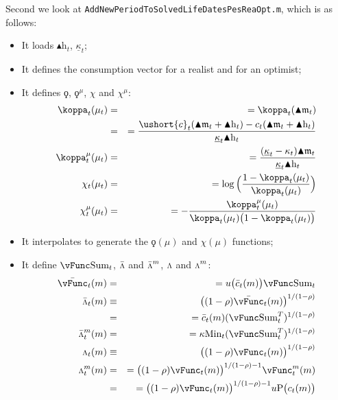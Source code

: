 \documentclass[titlepage,abstract]{\econtex}
\providecommand{\kappaMin}{\kappa\text{Min}}
\providecommand{\vSum}{\vFunc\text{Sum}}
\providecommand{\Deltah}{\blacktriangle \mathrm{h}}
\providecommand{\Deltam}{\blacktriangle \mathfrak{m}}
\providecommand{\vInv}{\ensuremath{\scriptstyle \Lambda \displaystyle}}
\begin{document}
Second we look at \texttt{AddNewPeriodToSolvedLifeDatesPesReaOpt.m}, which is as follows:
        \begin{itemize}
        \item It loads $\Deltah_{t}$, $\underline{\kappa}_{t}$;
        \item It defines the consumption vector for a realist and for an optimist;
        \item It defines $\ensuremath{\koppa}$, $\ensuremath{\koppa}^{\mu}$, $\chi$ and $\chi^{\mu}$:
            \begin{equation}\begin{gathered}\begin{aligned}
            \koppa_{t} (\mu_{t})  &=& =  \koppa_{t} (\Deltam_{t}) \\
             &=& =  \frac{\ushort{c}_{t}(\Deltam_{t} + \Deltah_{t})-c_{t}(\Deltam_{t} + \Deltah _{t})}{\underline{\kappa}_{t} \Deltah_{t}} \\
            \koppa_{t}^{\mu} (\mu_{t})  &=& =  \frac{(\underline{\kappa}_{t}-\kappa_{t}) \Deltam_{t}}{\underline{\kappa}_{t} \Deltah_{t}} \\
            \chi_{t} (\mu_{t})  &=& =  \log\Big(\frac{1-\koppa_{t} (\mu_{t})}{\koppa_{t} (\mu_{t}) }\Big) \\
            \chi_{t}^{\mu} (\mu_{t})  &=& =  -\frac{\koppa_{t}^{\mu}(\mu_{t})}{\koppa_{t} (\mu_{t})\big(1-\koppa_{t} (\mu_{t})\big)}
            \end{aligned}\end{gathered}\end{equation}
        \item It interpolates to generate the $\ensuremath{\koppa}(\mu)$ and $\chi(\mu)$ functions;
        \item It define $\vSum_{t}$, $\bar{\vInv}$ and $\bar{\vInv}^{m}$, $\vInv$ and $\vInv^{m}$:
            \begin{equation}\begin{gathered}\begin{aligned}
            \bar{\vFunc}_{t} (m)  &=& =  u\big(\bar{c}_{t}(m)\big) \vSum_{t} \\
            \bar{\vInv}_{t} (m) &\equiv&
            \big((1-\rho)\bar{\vFunc}_{t} (m)\big)^{1/(1-\rho)} \\
             &=& = \bar{c}_{t}(m) (\vSum_{t}^{T})^{1/(1-\rho)} \\
            \bar{\vInv}_{t}^{m} (m)  &=& = 
            \kappaMin_{t} (\vSum_{t}^{T})^{1/(1-\rho)} \\
            \vInv_{t} (m) &\equiv&
            \big((1-\rho)\vFunc_{t} (m)\big)^{1/(1-\rho)} \\
            \vInv_{t}^{m} (m)  &=& = 
            \big((1-\rho)\vFunc_{t} (m)\big)^{1/(1-\rho)-1} \vFunc_{t}^{m} (m)\\
             &=& = 
            \big((1-\rho)\vFunc_{t} (m)\big)^{1/(1-\rho)-1} u\text{P}\big(c_{t}(m)\big) \\
            \end{aligned}\end{gathered}\end{equation}


\end{itemize}
\end{document}

